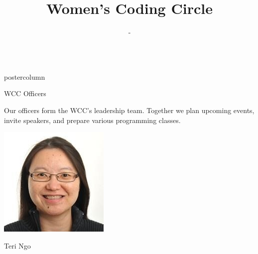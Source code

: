 \documentclass{beamer}
\title{\huge Women's Coding Circle}
\author{-}
\institute{HHMI Janelia Research Campus, Ashburn, USA}
\newlength{\columnheight}
\begin{document}
\begin{frame}
\vspace{-12cm}
\begin{columns}
	\begin{column}{.33\textwidth}
		\begin{beamercolorbox}[center,wd=\textwidth]{postercolumn}
			\begin{minipage}[T]{.95\textwidth}  %
				\parbox[t][\columnheight]{\textwidth}{ %
					\begin{myblock}{WCC Officers}
					    \begin{addmargin}[1em]{1em}
                            Our officers form the WCC's leadership team. Together we plan upcoming events, invite speakers, and prepare various programming classes.
                        \end{addmargin}
                        \begin{addmargin}[1em]{1em}
                            \vspace{1.5cm}
                            \begin{minipage}{0.3\linewidth}
                                \includegraphics[width=\linewidth]{img/teri.jpg}
                                \centerline{Teri Ngo}

\end{minipage}
\end{addmargin}
\end{myblock}}
\end{minipage}
\end{beamercolorbox}
\end{column}
\end{columns}
\end{frame}
\end{document}

